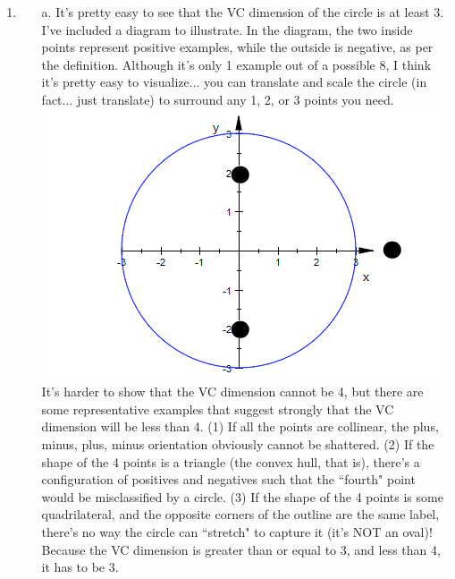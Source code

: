 
\usepackage{graphicx}
\oddsidemargin 0in
\evensidemargin 0in
\textwidth 6.5in
\topmargin -0.5in
\textheight 9.0in





\pagestyle{myheadings}  %

\begin{enumerate}
\item
    \begin{enumerate}
    \item [a.] It's pretty easy to see that the VC dimension of the circle is at least 3. I've included a diagram to illustrate. In the diagram, the two inside points represent positive examples, while the outside is negative, as per the definition. Although it's only 1 example out of a possible 8, I think it's pretty easy to visualize... you can translate and scale the circle (in fact... just translate) to surround any 1, 2, or 3 points you need.
    \includegraphics[scale=0.5]{circle}\\
    It's harder to show that the VC dimension cannot be 4, but there are some representative examples that suggest strongly that the VC dimension will be less than 4. (1) If all the points are collinear, the plus, minus, plus, minus orientation obviously cannot be shattered. (2) If the shape of the 4 points is a triangle (the convex hull, that is), there's a configuration of positives and negatives such that the ``fourth" point would be misclassified by a circle. (3) If the shape of the 4 points is some quadrilateral, and the opposite corners of the outline are the same label, there's no way the circle can ``stretch" to capture it (it's NOT an oval)! Because the VC dimension is greater than or equal to 3, and less than 4, it has to be 3.

\end{enumerate}
\end{enumerate}
